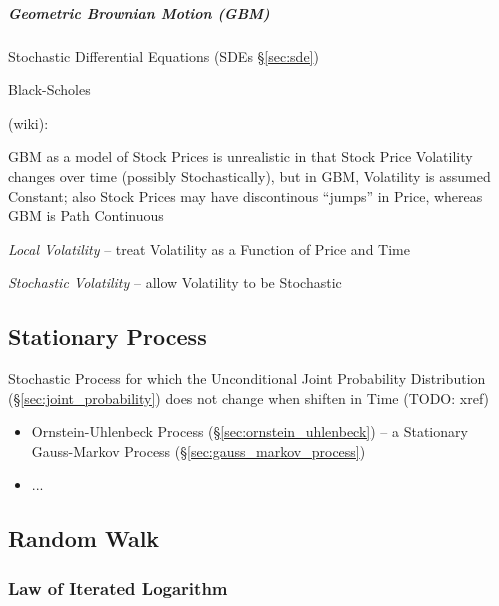 \subparagraph{Geometric Brownian Motion (GBM)}\label{sec:gbm}\hfill

Stochastic Differential Equations (SDEs \S\ref{sec:sde})

Black-Scholes

(wiki):

GBM as a model of Stock Prices is unrealistic in that Stock Price Volatility
changes over time (possibly Stochastically), but in GBM, Volatility is assumed
Constant; also Stock Prices may have discontinous ``jumps'' in Price, whereas
GBM is Path Continuous

\emph{Local Volatility} -- treat Volatility as a Function of Price and Time

\emph{Stochastic Volatility} -- allow Volatility to be Stochastic



\subsection{Stationary Process}\label{sec:stationary_process}

Stochastic Process for which the Unconditional Joint Probability Distribution
(\S\ref{sec:joint_probability}) does not change when shiften in Time (TODO:
xref)

\begin{itemize}
  \item Ornstein-Uhlenbeck Process (\S\ref{sec:ornstein_uhlenbeck}) -- a
    Stationary Gauss-Markov Process (\S\ref{sec:gauss_markov_process})
  \item ...
\end{itemize}



\subsection{Random Walk}\label{sec:random_walk}

\subsubsection{Law of Iterated Logarithm}\label{sec:iterated_logarithm}

